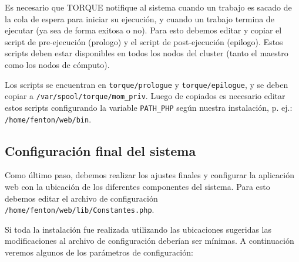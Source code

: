 \documentclass[a4paper,10pt,spanish]{article}
\begin{document}
Es necesario que TORQUE notifique al sistema cuando un trabajo es sacado de la cola de espera para iniciar su ejecuci\'{o}n, y cuando un trabajo termina de ejecutar (ya sea de forma exitosa o no). Para esto debemos editar y copiar el script de pre-ejecuci\'{o}n (prologo) y el script de post-ejecuci\'{o}n (epilogo). Estos scripts deben estar disponibles en todos los nodos del cluster (tanto el maestro como los nodos de c\'{o}mputo). 

Los scripts se encuentran en \mbox{\texttt{torque/prologue}} y \mbox{\texttt{torque/epilogue}}, y se deben copiar a \mbox{\texttt{/var/spool/torque/mom\_priv}}. Luego de copiados es necesario editar estos scripts configurando la variable \mbox{\texttt{PATH\_PHP}} seg\'{u}n nuestra instalaci\'{o}n, p. ej.: \mbox{\texttt{/home/fenton/web/bin}}.

\subsection{Configuraci\'{o}n final del sistema}

Como \'{u}ltimo paso, debemos realizar los ajustes finales y configurar la aplicaci\'{o}n web con la ubicaci\'{o}n de los diferentes componentes del sistema. Para esto debemos editar el archivo de configuraci\'{o}n \mbox{\texttt{/home/fenton/web/lib/Constantes.php}}.

Si toda la instalaci\'{o}n fue realizada utilizando las ubicaciones sugeridas las modificaciones al archivo de configuraci\'{o}n deber\'{i}an ser m\'{i}nimas. A continuaci\'{o}n veremos algunos de los par\'{a}metros de configuraci\'{o}n:
\end{document}
